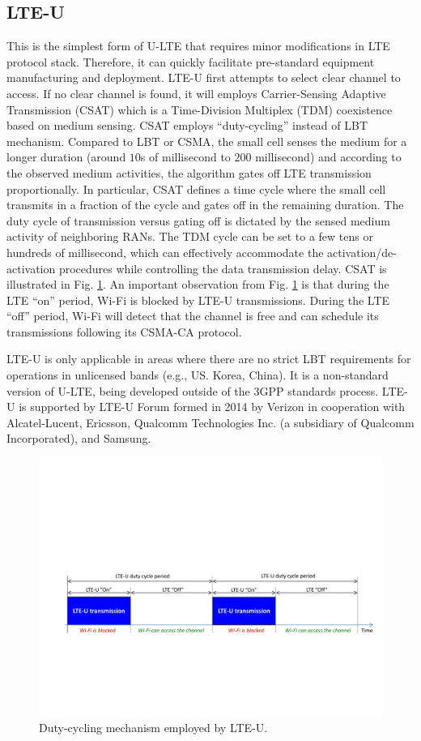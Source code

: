 \subsection{LTE-U}

\noindent This is the simplest form of U-LTE that requires minor modifications in LTE protocol stack. Therefore, it can quickly facilitate pre-standard equipment manufacturing and deployment. LTE-U first attempts to select clear channel to access. If no clear channel is found, it will employs Carrier-Sensing Adaptive Transmission (CSAT) which is a Time-Division Multiplex (TDM) coexistence based on medium sensing. CSAT employs ``duty-cycling'' instead of LBT mechanism. Compared to LBT or CSMA, the small cell senses the medium for a longer duration (around $10$s of millisecond to $200$ millisecond) and according to the observed medium activities, the algorithm gates off LTE transmission proportionally. In particular, CSAT defines a time cycle where the small cell transmits in a fraction of the cycle and gates off in the remaining duration. The duty cycle of transmission versus gating off is dictated by the sensed medium activity of neighboring RANs. The TDM cycle can be set to a few tens or hundreds of millisecond, which can effectively accommodate the activation/de-activation procedures while controlling the data transmission delay. CSAT is illustrated in Fig. \ref{figs:LTE-U}. An important observation from Fig. \ref{figs:LTE-U} is that during the LTE ``on'' period, Wi-Fi is blocked by LTE-U transmissions. During the LTE ``off'' period, Wi-Fi will detect that the channel is free and can schedule its transmissions following its CSMA-CA protocol.

LTE-U is only applicable in areas where there are no strict LBT requirements for operations in unlicensed bands (e.g., US. Korea, China). It is a non-standard version of U-LTE, being developed outside of the 3GPP standards process. LTE-U is supported by LTE-U Forum formed in 2014 by Verizon in cooperation with Alcatel-Lucent, Ericsson, Qualcomm Technologies Inc. (a subsidiary of Qualcomm Incorporated), and Samsung.

\begin{figure}[!t]
	\centering
	\includegraphics[width=0.95\columnwidth]{figures2/LTE-U}
	\caption{Duty-cycling mechanism employed by LTE-U.}
	\label{figs:LTE-U}
\end{figure}


